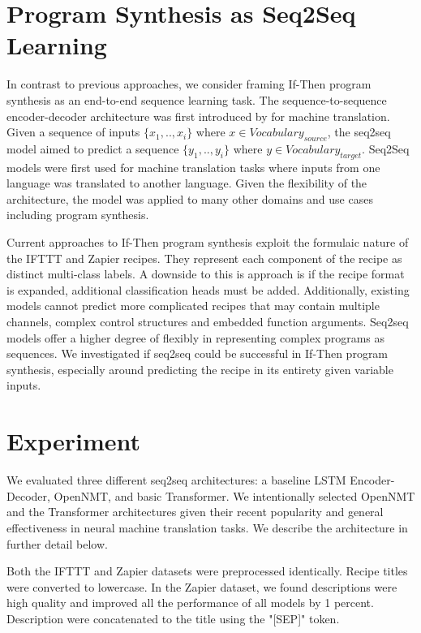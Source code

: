 \documentclass[letterpaper]{article} %
\begin{document}
\section{Program Synthesis as Seq2Seq Learning}
In contrast to previous approaches, we consider framing If-Then program synthesis as an end-to-end sequence learning task. The sequence-to-sequence encoder-decoder architecture was first introduced by \citeauthor{DBLP:journals/corr/SutskeverVL14} \citeyear{DBLP:journals/corr/SutskeverVL14} for machine translation. Given a sequence of inputs $\{x_1, .., x_i\}$ where $x \in Vocabulary_{source}$, the seq2seq model aimed to predict a sequence $\{y_1, .., y_i\}$ where $y \in Vocabulary_{target}$. Seq2Seq models were first used for machine translation tasks where inputs from one language was translated to another language. Given the flexibility of the architecture, the model was applied to many other domains and use cases including program synthesis.

Current approaches to If-Then program synthesis exploit the formulaic nature of the IFTTT and Zapier recipes. They represent each component of the recipe as distinct multi-class labels. A downside to this is approach is if the recipe format is expanded, additional classification heads must be added. Additionally, existing models cannot predict more complicated recipes that may contain multiple channels, complex control structures and embedded function arguments. Seq2seq models offer a higher degree of flexibly in representing complex programs as sequences. We investigated if seq2seq could be successful in If-Then program synthesis, especially around predicting the recipe in its entirety given variable inputs.  


\section{Experiment}
We evaluated three different seq2seq architectures: a baseline LSTM Encoder-Decoder, OpenNMT, and basic Transformer. We intentionally selected OpenNMT and the Transformer architectures given their recent popularity and general effectiveness in neural machine translation tasks. We describe the architecture in further detail below. 

Both the IFTTT and Zapier datasets were preprocessed identically. Recipe titles were converted to lowercase. In the Zapier dataset, we found descriptions were high quality and improved all the performance of all models by 1 percent. Description were concatenated to the title using the "[SEP]" token.
\end{document}
